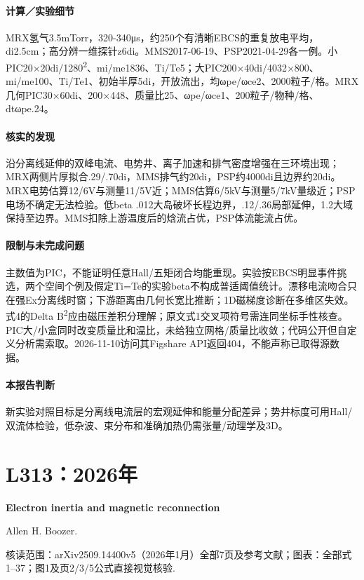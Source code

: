 \paragraph{计算／实验细节}MRX氢气3.5mTorr，320-340μs，约250个有清晰EBCS的重复放电平均，di2.5cm；高分辨一维探针z6di。MMS2017-06-19、PSP2021-04-29各一例。小PIC20×20di/1280\textsuperscript{2}、mi/me1836、Ti/Te5；大PIC200×40di/4032×800、mi/me100、Ti/Te1、初始半厚5di，开放流出，均ωpe/ωce2、2000粒子/格。MRX几何PIC30×60di、200×448、质量比25、ωpe/ωce1、200粒子/物种/格、dtωpe.24。

\paragraph{核实的发现}沿分离线延伸的双峰电流、电势井、离子加速和排气密度增强在三环境出现；MRX两侧片厚拟合.29/.70di，MMS排气约20di，PSP约4000di且边界约20di。MRX电势估算12/6V与测量11/5V近；MMS估算6/5kV与测量5/7kV量级近；PSP电场不确定无法检验。低beta .012大岛破坏长程边界，.12/.36局部延伸，1.2大域保持至边界。MMS扣除上游温度后的焓流占优，PSP体流能流占优。

\paragraph{限制与未完成问题}主数值为PIC，不能证明任意Hall/五矩闭合均能重现。实验按EBCS明显事件挑选，两个空间个例及假定Ti=Te的实验beta不构成普适阈值统计。漂移电流吻合只在强Ex分离线时窗；下游距离由几何长宽比推断；1D磁梯度诊断在多维区失效。式4的Delta B\textsuperscript{2}应由磁压差积分理解；原文式1交叉项符号需连同坐标手性核查。PIC大/小盒同时改变质量比和温比，未给独立网格/质量比收敛；代码公开但自定义分析需索取。2026-11-10访问其Figshare API返回404，不能声称已取得源数据。

\paragraph{本报告判断}新实验对照目标是分离线电流层的宏观延伸和能量分配差异；势井标度可用Hall/双流体检验，低杂波、束分布和准确加热仍需张量/动理学及3D。

\section{L313：2026年}\label{paper:L313}

\textbf{Electron inertia and magnetic reconnection}\citep{L313}\

Allen H. Boozer.

\textsf{核读范围：}arXiv2509.14400v5（2026年1月）全部7页及参考文献；\textsf{图表：}全部式1–37；图1及页2/3/5公式直接视觉核验.

